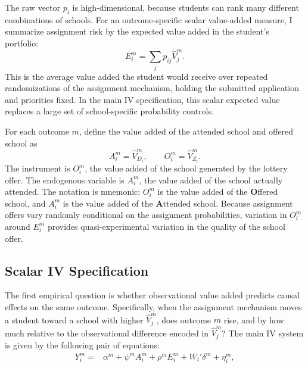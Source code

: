 \documentclass[a4paper, article, english, oneside, unknownkeysallowed, 12pt]{memoir}
\begin{document}
The raw vector $p_i$ is high-dimensional, because students can rank many different combinations of schools.
For an outcome-specific scalar value-added measure, I summarize assignment risk by the expected value added in the student's portfolio:
\begin{equation}
  E_i^m = \sum_j p_{ij}\widehat{V}_j^m.
  \label{eq:expected-va}
\end{equation}
This is the average value added the student would receive over repeated randomizations of the assignment mechanism, holding the submitted application and priorities fixed.
In the main IV specification, this scalar expected value replaces a large set of school-specific probability controls.

For each outcome $m$, define the value added of the attended school and offered school as
\begin{equation}
  A_i^m = \widehat{V}_{D_i}^m,
  \qquad
  O_i^m = \widehat{V}_{Z_i}^m.
  \label{eq:attended-offered-va}
\end{equation}
The instrument is $O_i^m$, the value added of the school generated by the lottery offer.
The endogenous variable is $A_i^m$, the value added of the school actually attended.
The notation is mnemonic: $O_i^m$ is the value added of the \textbf{O}ffered school, and $A_i^m$ is the value added of the \textbf{A}ttended school.
Because assignment offers vary randomly conditional on the assignment probabilities, variation in $O_i^m$ around $E_i^m$ provides quasi-experimental variation in the quality of the school offer.


\subsection{Scalar IV Specification}

The first empirical question is whether observational value added predicts causal effects on the same outcome.
Specifically, when the assignment mechanism moves a student toward a school with higher $\widehat{V}_j^m$, does outcome $m$ rise, and by how much relative to the observational difference encoded in $\widehat{V}_j^m$?
The main IV system is given by the following pair of equations:
\noindent
  \begin{equation}
    \begin{aligned}
      Y_i^m ={}& \alpha^m + \psi^m A_i^m + \rho^m E_i^m +  W_i'\delta^m + \eta_i^m,
    \end{aligned}
    \label{eq:pass-through}
  \end{equation}
\end{document}
